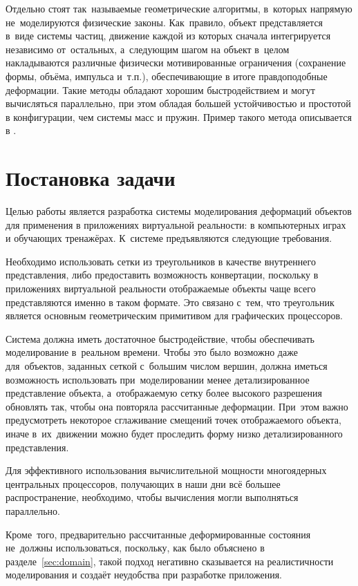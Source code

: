 \documentclass[a4paper, 14pt, titlepage]{extarticle}
\let\oldsection\section
\renewcommand{\section}{\newpage\oldsection}
\begin{document}
    Отдельно стоят так~называемые геометрические алгоритмы, в~которых напрямую не~моделируются
    физические законы. Как~правило, объект представляется в~виде системы частиц, движение каждой из
    которых сначала интегрируется независимо от~остальных, а~следующим шагом на объект в~целом
    накладываются различные физически мотивированные ограничения (сохранение формы, объёма, импульса
    и~т.п.), обеспечивающие в итоге правдоподобные деформации. Такие методы обладают хорошим
    быстродействием и могут вычисляться параллельно, при этом обладая большей устойчивостью и
    простотой в конфигурации, чем системы масс и пружин. Пример такого метода описывается в \cite{mueller-meshless}.

  \section{Постановка задачи}\label{sec:task}

    Целью работы является разработка системы моделирования деформаций объектов для применения в
    приложениях виртуальной реальности: в компьютерных играх и обучающих тренажёрах.
    К~системе предъявляются следующие требования.

    Необходимо использовать сетки из треугольников в качестве внутреннего представления, либо
    предоставить возможность конвертации, поскольку в приложениях виртуальной реальности отображаемые объекты
    чаще всего представляются именно в таком формате. Это связано с~тем, что треугольник является
    основным геометрическим примитивом для графических процессоров. %

    Система должна иметь достаточное быстродействие, чтобы обеспечивать моделирование в~реальном
    времени. Чтобы это было возможно даже для~объектов, заданных сеткой с~большим числом вершин,
    должна иметься возможность использовать при~моделировании менее детализированное представление
    объекта, а~отображаемую сетку более высокого разрешения обновлять так, чтобы она повторяла
    рассчитанные деформации. При~этом важно предусмотреть некоторое сглаживание смещений точек
    отображаемого объекта, иначе в~их~движении можно будет проследить форму низко детализированного
    представления.

    Для эффективного использования вычислительной мощности многоядерных центральных процессоров,
    получающих в наши дни всё большее распространение, необходимо, чтобы вычисления могли
    выполняться параллельно.

    Кроме~того, предварительно рассчитанные деформированные состояния не~должны использоваться,
    поскольку, как было объяснено в разделе~\ref{sec:domain}, такой подход негативно сказывается на реалистичности
    моделирования и создаёт неудобства при разработке приложения.
\end{document}
